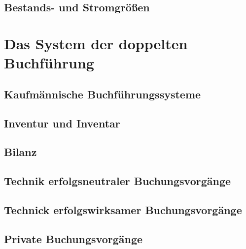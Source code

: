\documentclass[paper=a4, fontsize=11pt]{scrartcl}
\numberwithin{equation}{section}
\numberwithin{figure}{section}
\numberwithin{table}{section}
\begin{document}
\subsection{Bestands- und Stromgrößen}


\newpage

\section{Das System der doppelten Buchführung}


\subsection{Kaufmännische Buchführungssysteme}


\subsection{Inventur und Inventar}


\subsection{Bilanz}


\subsection{Technik erfolgsneutraler Buchungsvorgänge}


\subsection{Technick erfolgswirksamer Buchungsvorgänge}


\subsection{Private Buchungsvorgänge}
\end{document}
